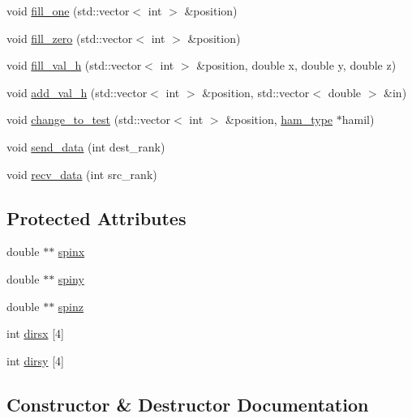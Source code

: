 \begin{DoxyCompactItemize}
\item 
void \hyperlink{classfield__2d__h_ac4ef3e08335182c46bfb6ff37cf447cd}{fill\+\_\+one} (std\+::vector$<$ int $>$ \&position)
\item 
void \hyperlink{classfield__2d__h_aa95c0be540a84b7a2365720ffc0c4520}{fill\+\_\+zero} (std\+::vector$<$ int $>$ \&position)
\item 
void \hyperlink{classfield__2d__h_a9a0a35285e1a3995e2768a8b43c4855a}{fill\+\_\+val\+\_\+h} (std\+::vector$<$ int $>$ \&position, double x, double y, double z)
\item 
void \hyperlink{classfield__2d__h_aa8777664592ab4317bca3734497e2404}{add\+\_\+val\+\_\+h} (std\+::vector$<$ int $>$ \&position, std\+::vector$<$ double $>$ \&in)
\item 
void \hyperlink{classfield__2d__h_a87173eff35d950aeb70b0c955c5c0e5d}{change\+\_\+to\+\_\+test} (std\+::vector$<$ int $>$ \&position, \hyperlink{classham__type}{ham\+\_\+type} $\ast$hamil)
\item 
void \hyperlink{classfield__2d__h_a9705fcf4d6fafbac4d2b37778a97fd00}{send\+\_\+data} (int dest\+\_\+rank)
\item 
void \hyperlink{classfield__2d__h_a04ab343341666fa7f237f953f963cda3}{recv\+\_\+data} (int src\+\_\+rank)
\end{DoxyCompactItemize}
\subsection*{Protected Attributes}
\begin{DoxyCompactItemize}
\item 
double $\ast$$\ast$ \hyperlink{classfield__2d__h_aa2763f7d369420b8baca0d34c885deab}{spinx}
\item 
double $\ast$$\ast$ \hyperlink{classfield__2d__h_a13c1fcf346bb1fac2ae507b494864bfb}{spiny}
\item 
double $\ast$$\ast$ \hyperlink{classfield__2d__h_a370ec3121a04ddf7e17f95540bbe5517}{spinz}
\item 
int \hyperlink{classfield__2d__h_ab20f326cbd41670086b78939dc21f370}{dirsx} \mbox{[}4\mbox{]}
\item 
int \hyperlink{classfield__2d__h_a8a316de6115eaba1dbde1f8f6a47fd2b}{dirsy} \mbox{[}4\mbox{]}
\end{DoxyCompactItemize}


\subsection{Constructor \& Destructor Documentation}
